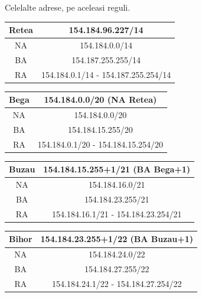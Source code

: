 \documentclass{article}
\begin{document}
Celelalte adrese, pe aceleasi reguli.


\begin{center}
    \begin{tabular}{||c|c||}
    \hline \hline
        Retea & 154.184.96.227/14 \\
    \hline \hline
        NA & 154.184.0.0/14  \\
            \hline
        BA & 154.187.255.255/14\\
            \hline
        RA & 154.184.0.1/14 - 154.187.255.254/14 \\
        \hline    \hline
    \end{tabular}
\end{center}


\begin{center}
    \begin{tabular}{|c|c|}
    \hline   
        Bega & 154.184.0.0/20 (NA Retea)\\
    \hline \hline
        NA & 154.184.0.0/20  \\
            \hline
        BA & 154.184.15.255/20\\
            \hline
        RA &  154.184.0.1/20 - 154.184.15.254/20 \\
        \hline 
    \end{tabular}
\end{center}

\begin{center}
    \begin{tabular}{|c|c|}
    \hline
        Buzau & 154.184.15.255+1/21 (BA Bega+1) \\
    \hline \hline 
        NA & 154.184.16.0/21  \\
            \hline
        BA & 154.184.23.255/21\\
            \hline
        RA &  154.184.16.1/21 - 154.184.23.254/21 \\
            \hline
    \end{tabular}
\end{center}

\begin{center}
    \begin{tabular}{|c|c|}
    \hline
        Bihor & 154.184.23.255+1/22 (BA Buzau+1) \\
    \hline \hline 
        NA & 154.184.24.0/22  \\
            \hline
        BA & 154.184.27.255/22\\
            \hline
        RA &  154.184.24.1/22 - 154.184.27.254/22 \\
            \hline
    \end{tabular}
\end{center}
\end{document}
